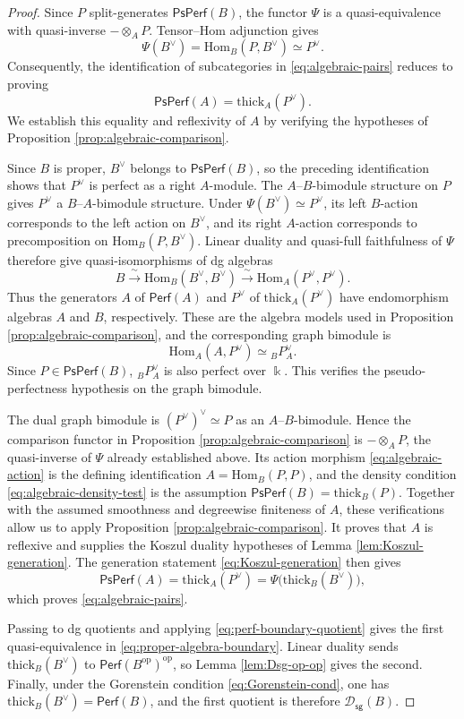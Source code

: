 \documentclass[11pt,letterpaper,reqno]{amsart}
\theoremstyle{plain}
\theoremstyle{definition}
\theoremstyle{plain}
\theoremstyle{definition}
\numberwithin{equation}{section}
\begin{document}
\begin{proof}
Since $P$ split-generates $\mathsf{PsPerf}(B)$, the functor $\Psi$ is a quasi-equivalence with quasi-inverse $-\otimes_A P$.
Tensor--Hom adjunction gives
\[
\Psi(B^\vee)
=\mathrm{Hom}_B(P,B^\vee)
\simeq P^\vee.
\]
Consequently, the identification of subcategories in \eqref{eq:algebraic-pairs} reduces to proving
\[
\mathsf{PsPerf}(A)=\mathrm{thick}_A(P^\vee).
\]
We establish this equality and reflexivity of $A$ by verifying the hypotheses of Proposition \ref{prop:algebraic-comparison}.

Since $B$ is proper, $B^\vee$ belongs to $\mathsf{PsPerf}(B)$, so the preceding identification shows that $P^\vee$ is perfect as a right $A$-module.
The $A$--$B$-bimodule structure on $P$ gives $P^\vee$ a $B$--$A$-bimodule structure.
Under $\Psi(B^\vee)\simeq P^\vee$, its left $B$-action corresponds to the left action on $B^\vee$, and its right $A$-action corresponds to precomposition on $\mathrm{Hom}_B(P,B^\vee)$.
Linear duality and quasi-full faithfulness of $\Psi$ therefore give quasi-isomorphisms of dg algebras
\[
B\xrightarrow{\;\sim\;}
\mathrm{Hom}_B(B^\vee,B^\vee)
\xrightarrow{\;\sim\;}
\mathrm{Hom}_A(P^\vee,P^\vee).
\]
Thus the generators $A$ of $\mathsf{Perf}(A)$ and $P^\vee$ of $\mathrm{thick}_A(P^\vee)$ have endomorphism algebras $A$ and $B$, respectively.
These are the algebra models used in Proposition \ref{prop:algebraic-comparison}, and the corresponding graph bimodule is
\[
\mathrm{Hom}_A(A,P^\vee)\simeq {}_B P^\vee_A.
\]
Since $P \in \mathsf{PsPerf}(B)$, ${}_B P^\vee_A$ is also perfect over $\Bbbk$.
This verifies the pseudo-perfectness hypothesis on the graph bimodule.

The dual graph bimodule is $(P^\vee)^\vee\simeq P$ as an $A$--$B$-bimodule.
Hence the comparison functor in Proposition \ref{prop:algebraic-comparison} is $-\otimes_A P$, the quasi-inverse of $\Psi$ already established above.
Its action morphism \eqref{eq:algebraic-action} is the defining identification $A=\mathrm{Hom}_B(P,P)$, and the density condition \eqref{eq:algebraic-density-test} is the assumption $\mathsf{PsPerf}(B)=\mathrm{thick}_B(P)$.
Together with the assumed smoothness and degreewise finiteness of $A$, these verifications allow us to apply Proposition \ref{prop:algebraic-comparison}.
It proves that $A$ is reflexive and supplies the Koszul duality hypotheses of Lemma \ref{lem:Koszul-generation}.
The generation statement \eqref{eq:Koszul-generation} then gives
\[
\mathsf{PsPerf}(A)
=\mathrm{thick}_A(P^\vee)
=\Psi\bigl(\mathrm{thick}_B(B^\vee)\bigr),
\]
which proves \eqref{eq:algebraic-pairs}.

Passing to dg quotients and applying \eqref{eq:perf-boundary-quotient} gives the first quasi-equivalence in \eqref{eq:proper-algebra-boundary}.
Linear duality sends $\mathrm{thick}_B(B^\vee)$ to $\mathsf{Perf}(B^{\mathrm{op}})^{\mathrm{op}}$, so Lemma \ref{lem:Dsg-op-op} gives the second.
Finally, under the Gorenstein condition \eqref{eq:Gorenstein-cond}, one has $\mathrm{thick}_B(B^\vee)=\mathsf{Perf}(B)$, and the first quotient is therefore $\mathscr D_{\mathsf{sg}}(B)$.
\end{proof}
\end{document}
